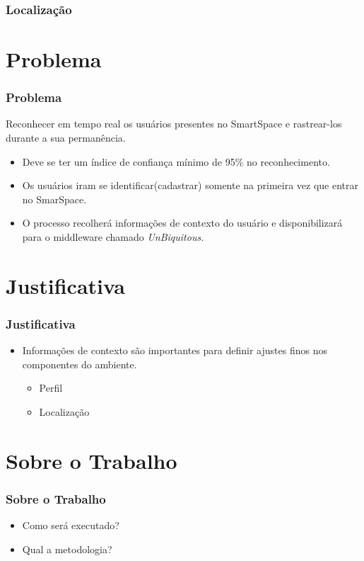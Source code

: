 \documentclass{beamer}
\begin{document}
\begin{frame}
    \frametitle{Localização}
   
\end{frame}

\section{Problema}
\begin{frame}
    \frametitle{Problema}
    Reconhecer em tempo real os usuários presentes no SmartSpace e rastrear-los durante a sua permanência. \\
	\begin{itemize}
      		\pause \item Deve se ter um índice de confiança mínimo de 95\% no reconhecimento. \\
		\pause \item Os usuários iram se identificar(cadastrar) somente na primeira vez que entrar no SmarSpace. \\
    		\pause \item O processo recolherá informações de contexto do usuário e disponibilizará para o middleware chamado \it{UnBiquitous}.
	\end{itemize}
\end{frame}

\section{Justificativa} 
\begin{frame}
    \frametitle{Justificativa}
    \begin{itemize}
      \item Informações de contexto são importantes para definir ajustes finos nos componentes do ambiente.
	    \begin{itemize}
		\item Perfil
		\item Localização
	    \end{itemize}
    \end{itemize}
\end{frame}


\section{Sobre o Trabalho}
\begin{frame}
    \frametitle{Sobre o Trabalho}
    \begin{itemize}
        \item Como será executado?
        \item Qual a metodologia?
    \end{itemize}
\end{frame}
\end{document}
